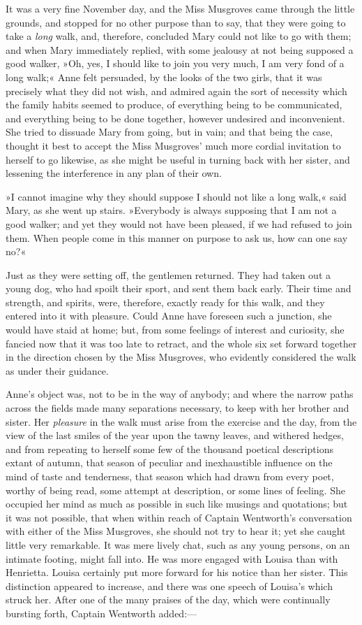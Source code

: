 It was a very fine November day, and the Miss Musgroves came through the little grounds, and stopped for no other purpose than to say, that they were going to take a \textit{long} walk, and, therefore, concluded Mary could not like to go with them; and when Mary immediately replied, with some jealousy at not being supposed a good walker, »Oh, yes, I should like to join you very much, I am very fond of a long walk;« Anne felt persuaded, by the looks of the two girls, that it was precisely what they did not wish, and admired again the sort of necessity which the family habits seemed to produce, of everything being to be communicated, and everything being to be done together, however undesired and inconvenient. She tried to dissuade Mary from going, but in vain; and that being the case, thought it best to accept the Miss Musgroves' much more cordial invitation to herself to go likewise, as she might be useful in turning back with her sister, and lessening the interference in any plan of their own.

»I cannot imagine why they should suppose I should not like a long walk,« said Mary, as she went up stairs. »Everybody is always supposing that I am not a good walker; and yet they would not have been pleased, if we had refused to join them. When people come in this manner on purpose to ask us, how can one say no?«

Just as they were setting off, the gentlemen returned. They had taken out a young dog, who had spoilt their sport, and sent them back early. Their time and strength, and spirits, were, therefore, exactly ready for this walk, and they entered into it with pleasure. Could Anne have foreseen such a junction, she would have staid at home; but, from some feelings of interest and curiosity, she fancied now that it was too late to retract, and the whole six set forward together in the direction chosen by the Miss Musgroves, who evidently considered the walk as under their guidance.

Anne's object was, not to be in the way of anybody; and where the narrow paths across the fields made many separations necessary, to keep with her brother and sister. Her \textit{pleasure} in the walk must arise from the exercise and the day, from the view of the last smiles of the year upon the tawny leaves, and withered hedges, and from repeating to herself some few of the thousand poetical descriptions extant of autumn, that season of peculiar and inexhaustible influence on the mind of taste and tenderness, that season which had drawn from every poet, worthy of being read, some attempt at description, or some lines of feeling. She occupied her mind as much as possible in such like musings and quotations; but it was not possible, that when within reach of Captain Wentworth's conversation with either of the Miss Musgroves, she should not try to hear it; yet she caught little very remarkable. It was mere lively chat, such as any young persons, on an intimate footing, might fall into. He was more engaged with Louisa than with Henrietta. Louisa certainly put more forward for his notice than her sister. This distinction appeared to increase, and there was one speech of Louisa's which struck her. After one of the many praises of the day, which were continually bursting forth, Captain Wentworth added:—

